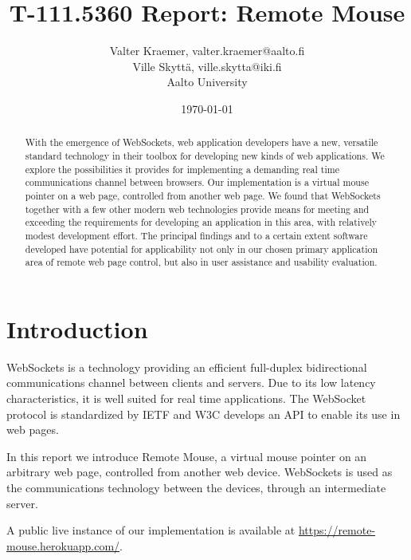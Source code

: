 \documentclass[a4paper,english,twocolumn,9pt]{extarticle}
\begin{document}
\title{T-111.5360 Report: Remote Mouse}

\author{Valter Kraemer, valter.kraemer@aalto.fi\\Ville Skyttä, ville.skytta@iki.fi\\Aalto University}

\date{\today}

\maketitle

\begin{abstract}
With the emergence of WebSockets, web application developers have a
new, versatile standard technology in their toolbox for developing new
kinds of web applications. We explore the possibilities it provides
for implementing a demanding real time communications channel between
browsers. Our implementation is a virtual mouse pointer on a web page,
controlled from another web page. We found that WebSockets together
with a few other modern web technologies provide means for meeting and
exceeding the requirements for developing an application in this area,
with relatively modest development effort. The principal findings and
to a certain extent software developed have potential for
applicability not only in our chosen primary application area of
remote web page control, but also in user assistance and usability
evaluation.
\end{abstract}


\section{Introduction}

WebSockets is a technology providing an efficient full-duplex
bidirectional communications channel between clients and servers. Due
to its low latency characteristics, it is well suited for real time
applications. The WebSocket protocol is standardized by IETF
\citep{rfc} and W3C \citep{w3c} develops an API to enable its use in
web pages.

In this report we introduce Remote Mouse, a virtual mouse pointer on
an arbitrary web page, controlled from another web device. WebSockets
is used as the communications technology between the devices, through
an intermediate server.

A public live instance of our implementation is available
at \url{https://remote-mouse.herokuapp.com/}.
\end{document}
